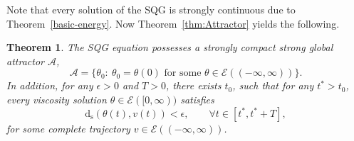 \documentclass{amsart}
\newcommand{\As}{\mathcal{A}_{\mathrm{s}}}
\newcommand{\A}{\mathcal{A}}
\newcommand{\ds}{\mathrm{d}_{\mathrm{s}}}
\newcommand{\Ec}{\mathcal{E}}
\newtheorem {Theorem}  {Theorem}
\numberwithin{Theorem}{section}
\theoremstyle{definition}
\theoremstyle{remark}
\begin{document}
Note that every solution of the SQG is strongly continuous due to Theorem~\ref{basic-energy}.
Now Theorem~\ref{thm:Attractor} yields the following.
\begin{Theorem}
The SQG equation possesses  a strongly compact strong global attractor $\A$,
\[
\A=\{ \theta_0: \ \theta_0=\theta(0) \mbox{ for some } \theta \in \Ec((-\infty, \infty))\}.
\] 
In addition, for any $\epsilon >0$ and $T>0$, there exists $t_0$,
such that for any $t^*>t_0$,  every viscosity solution $\theta \in \Ec([0,\infty))$
satisfies
\[
\ds(\theta(t), v(t)) < \epsilon, \qquad \forall t\in [t^*,t^*+T],
\]
for some complete trajectory $v \in \Ec((-\infty,\infty))$.
\end{Theorem}


\end{document}
